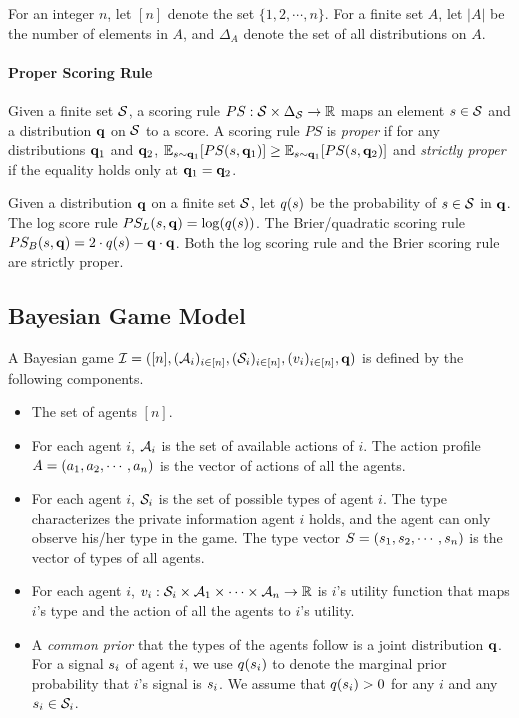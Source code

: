 For an integer $n$, let $[n]$ denote the set $\{1,2, \cdots, n\}$. For a finite set $A$, let $|A|$ be the number of elements in $A$, and $\Delta_{A}$ denote the set of all distributions on $A$. 

\paragraph{Proper Scoring Rule} Given a finite set $\mathcal{S}$, a scoring rule $PS: \mathcal{S}\times \Delta_{\mathcal{S}} \to \mathbb{R}$ maps an element $s\in\mathcal{S}$ and a distribution $\mathbf{q}$ on $\mathcal{S}$ to a score. A scoring rule $PS$ is {\em proper} if for any distributions $\mathbf{q}_1$ and $\mathbf{q}_2$, $\mathbb{E}_{s \sim \mathbf{q}_1}[PS(s, \mathbf{q}_1)] \ge \mathbb{E}_{s \sim \mathbf{q}_1}[PS(s, \mathbf{q}_2)]$ and {\em strictly proper} if the equality holds only at $\mathbf{q}_1 = \mathbf{q}_2$. 
\begin{example}
    Given a distribution $\mathbf{q}$ on a finite set $\mathcal{S}$, let $q(s)$ be the probability of $s\in \mathcal{S}$ in $\mathbf{q}$. The log score rule $PS_L(s, \mathbf{q}) = \log (q(s))$. The Brier/quadratic scoring rule $PS_B(s, \mathbf{q}) = 2\cdot q(s) - \mathbf{q}\cdot \mathbf{q}$. Both the log scoring rule and the Brier scoring rule are strictly proper. 
\end{example}

\subsection{Bayesian Game Model}
A Bayesian game $\mathcal{I} = ([n], (\mathcal{A}_i)_{i \in [n]}, (\mathcal{S}_i)_{i\in[n]}, (v_i)_{i\in [n]}, \mathbf{q})$ is defined by the following components. 
\begin{itemize}
    \item The set of agents $[n]$. 
    \item For each agent $i$, $\mathcal{A}_i$ is the set of available actions of $i$. The action profile $A = (a_1, a_2, \cdots, a_n)$ is the vector of actions of all the agents. 
    \item For each agent $i$, $\mathcal{S}_i$ is the set of possible types of agent $i$. The type characterizes the private information agent $i$ holds, and the agent can only observe his/her type in the game. The type vector $S = (s_1, s_2, \cdots, s_n)$ is the vector of types of all agents. 
    \item For each agent $i$, $v_i: \mathcal{S}_i \times \mathcal{A}_1\times \cdots \times \mathcal{A}_n \to \mathbb{R}$ is $i$'s utility function that maps $i$'s type and the action of all the agents to $i$'s utility. 
    \item A {\em common prior} that the types of the agents follow is a joint distribution $\mathbf{q}$. For a signal $s_i$ of agent $i$, we use $q(s_i)$ to denote the marginal prior probability that $i$'s signal is $s_i$. We assume that $q(s_i) > 0$ for any $i$ and any $s_i \in \mathcal{S}_i$. 
\end{itemize}

